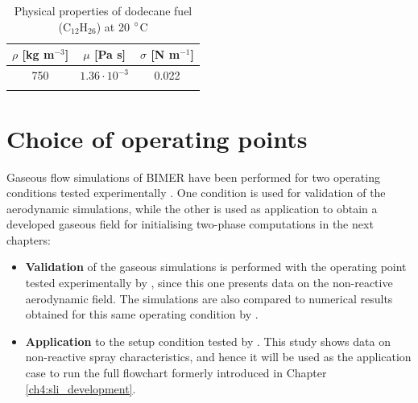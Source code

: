 \begin{table}[!h]
\centering
\caption{Physical properties of dodecane fuel (C$_{12}$H$_26$) at 20 $\degree$C}
\begin{tabular}{ccc}
\thickhline
$\rho$ [kg m$^{-3}$]   & $\mu$ [Pa s]   & $\sigma$ [N m$^{-1}$]  \\
\hline
750 & $1.36 \cdot 10^{-3}$ & 0.022 \\
\thickhline
\end{tabular}
\label{tab:dodecane_properties}
\end{table}

\clearpage

\section{Choice of operating points}

Gaseous flow simulations of BIMER have been performed for two operating conditions tested experimentally . One condition is used for validation of the aerodynamic simulations, while the other is used as application to obtain a developed gaseous field for initialising two-phase computations in the next chapters:

\begin{itemize}

	\item \textbf{Validation} of the gaseous simulations is performed with the operating point tested experimentally by , since this one presents data on the non-reactive aerodynamic field. The simulations are also compared to numerical results obtained for this same operating condition by . 
	
	\item \textbf{Application} to the setup condition tested by . This study shows data on non-reactive spray characteristics, and hence it will be used as the application case to run the full flowchart formerly introduced in Chapter \ref{ch4:sli_development}. %

\end{itemize}

